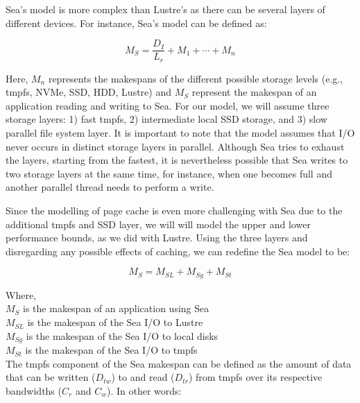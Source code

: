 \documentclass[10pt,journal,compsoc]{IEEEtran}
\begin{document}
      Sea's model is more complex than Lustre's as there can be several layers
      of different devices. For instance, Sea's model can be defined as:

      \begin{equation}\label{eq:sea-comp:sea}
          M_{S} = \frac{D_{I}}{L_{r}} + M_{1} + \cdots + M_{n}
      \end{equation}

      Here, $M_{n}$ represents the makespans of the different possible storage
      levels (e.g., tmpfs, NVMe, SSD, HDD, Lustre) and $M_{S}$ represent the
      makespan of an application reading and writing to Sea. For our model, we
      will assume three storage layers: 1) fast tmpfs, 2) intermediate local SSD
      storage, and 3) slow parallel file system layer. It is important to note that
      the model assumes that I/O never occurs in distinct storage layers in parallel.
      Although Sea tries to exhaust the layers, starting from the fastest, it is nevertheless
      possible that Sea writes to two storage layers at the same time, for instance, when one becomes full
      and another parallel thread needs to perform a write.

      Since the modelling of page cache is even more challenging with Sea due to
      the additional tmpfs and SSD layer, we will will model the upper and lower
      performance bounds, as we did with Lustre. Using the three layers and
      disregarding any possible effects of caching, we can redefine the Sea
      model to be:

      \begin{equation}\label{eq:sea-comp:snc}
          M_{S} = M_{SL} + M_{Sg} + M_{St}
      \end{equation}

      Where, \\
      $M_{S}$ is the makespan of an application using Sea \\
      $M_{SL}$ is the makespan of the Sea I/O to Lustre \\
      $M_{Sg}$ is the makespan of the Sea I/O to local disks \\
      $M_{St}$ is the makespan of the Sea I/O to tmpfs \\



      The tmpfs component of the Sea makespan can be defined as the amount of
      data that can be written ($D_{tw}$) to and read ($D_{tr}$) from tmpfs over
      its respective bandwidths ($C_{r}$ and $C_{w}$). In other words:
\end{document}
